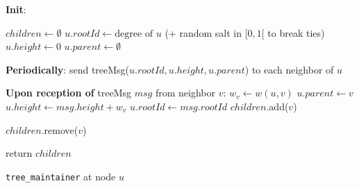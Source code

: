 \documentclass[conference]{IEEEtran}
\begin{document}
\begin{algorithm}[t]
\begin{algorithmic}
\begin{small}


\State \textbf{Init}:

	\State $children \leftarrow \emptyset$
	\State $u.rootId \leftarrow \text{degree of }u$ (+ random salt in $[0,1[$ to break ties)
	\State $u.height \leftarrow 0$
	\State $u.parent \leftarrow \emptyset$

\vspace{0.06in}

\State \textbf{Periodically}:
	\State send treeMsg($u.rootId, u.height, u.parent$) to each neighbor of $u$

\vspace{0.06in}

\State \textbf{Upon reception of} treeMsg $msg$ from neighbor $v$:
	\State $w_v \leftarrow w(u,v)$ 
		\State $u.parent \leftarrow v$
		\State $u.height \leftarrow msg.height + w_v$
		\State $u.rootId \leftarrow msg.rootId$
	\EndIf
		\State $children$.add($v$)

	\EndIf
		\State $children$.remove($v$)
	\EndIf

\vspace{0.06in}

	\State return $children$
\EndProcedure
\end{small}
\end{algorithmic}
\caption{\texttt{tree\_maintainer} at node $u$}
\label{alg:simpleTreeMaint}
\end{algorithm}
\end{document}
